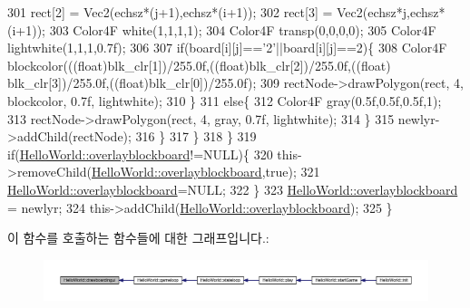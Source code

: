 \begin{DoxyCode}
301             rect[2] = Vec2(echsz*(j+1),echsz*(i+1));
302             rect[3] = Vec2(echsz*j,echsz*(i+1));
303             Color4F white(1,1,1,1);
304             Color4F transp(0,0,0,0);
305                 Color4F lightwhite(1,1,1,0.7f);
306             
307                 \textcolor{keywordflow}{if}(board[i][j]==\textcolor{charliteral}{'2'}||board[i][j]==2)\{
308                     Color4F blockcolor(((\textcolor{keywordtype}{float})blk\_clr[1])/255.0f,((\textcolor{keywordtype}{float})blk\_clr[2])/255.0f,((\textcolor{keywordtype}{float})
      blk\_clr[3])/255.0f,((\textcolor{keywordtype}{float})blk\_clr[0])/255.0f);
309                     rectNode->drawPolygon(rect, 4, blockcolor, 0.7f, lightwhite);
310                 \}
311                 \textcolor{keywordflow}{else}\{
312                     Color4F gray(0.5f,0.5f,0.5f,1);
313                     rectNode->drawPolygon(rect, 4, gray, 0.7f, lightwhite);
314                 \}
315             newlyr->addChild(rectNode);
316             \}
317         \}
318     \}
319     \textcolor{keywordflow}{if}(\hyperlink{class_hello_world_acc967707dff45c20f68321f07c86a21b}{HelloWorld::overlayblockboard}!=NULL)\{
320         this->removeChild(\hyperlink{class_hello_world_acc967707dff45c20f68321f07c86a21b}{HelloWorld::overlayblockboard},\textcolor{keyword}{true});
321         \hyperlink{class_hello_world_acc967707dff45c20f68321f07c86a21b}{HelloWorld::overlayblockboard}=NULL;
322     \}
323     \hyperlink{class_hello_world_acc967707dff45c20f68321f07c86a21b}{HelloWorld::overlayblockboard} = newlyr;
324     this->addChild(\hyperlink{class_hello_world_acc967707dff45c20f68321f07c86a21b}{HelloWorld::overlayblockboard});
325 \}
\end{DoxyCode}
이 함수를 호출하는 함수들에 대한 그래프입니다.\+:
\nopagebreak
\begin{figure}[H]
\begin{center}
\leavevmode
\includegraphics[width=350pt]{d9/d98/class_hello_world_a0456ce3ab8880643c5e8739634156d93_icgraph}
\end{center}
\end{figure}
\mbox{\label{class_hello_world_ab2e9dbd1b003e6d26a10a76495efcc2a}} 
